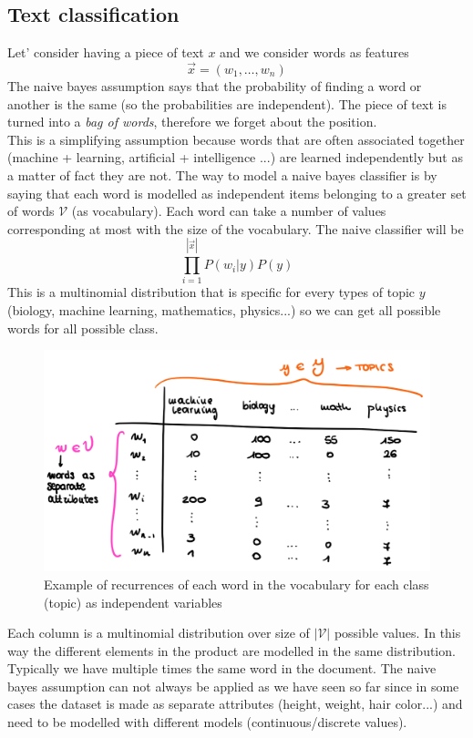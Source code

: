     \subsection{Text classification}
    Let' consider having a piece of text $x$ and we consider words as features
    $$\Vec{x} = (w_1, \dots, w_n)$$
    The naive bayes assumption says that the probability of finding a word or another is the same (so the probabilities are independent). The piece of text is turned into a \textit{bag of words}, therefore we forget about the position.\\
    This is a simplifying assumption because words that are often associated together (machine + learning, artificial + intelligence ...) are learned independently but as a matter of fact they are not.
    The way to model a naive bayes classifier is by saying that each word is modelled as independent items belonging to a greater set of words $\mathcal{V}$ (as vocabulary). 
    Each word can take a number of values corresponding at most with the size of the vocabulary.
    The naive classifier will be
    $$\prod_{i=1}^{|\Vec{x}|} P(w_i|y)P(y)$$
    This is a multinomial distribution that is specific for every types of topic $y$ (biology, machine learning, mathematics, physics...) so we can get all possible words for all possible class. 
    \begin{figure}[ht]
        \centering
        \includegraphics[scale=0.4]{images/text classification.png}
        \caption{Example of recurrences of each word in the vocabulary for each class (topic) as independent variables}
        \label{fig:naive_text}
    \end{figure}
    Each column is a multinomial distribution over size of $|\mathcal{V}|$ possible values. In this way the different elements in the product are modelled in the same distribution. Typically we have multiple times the same word in the document.
    The naive bayes assumption can not always be applied as we have seen so far since in some cases the dataset is made as separate attributes (height, weight, hair color...) and need to be modelled with different models (continuous/discrete values).